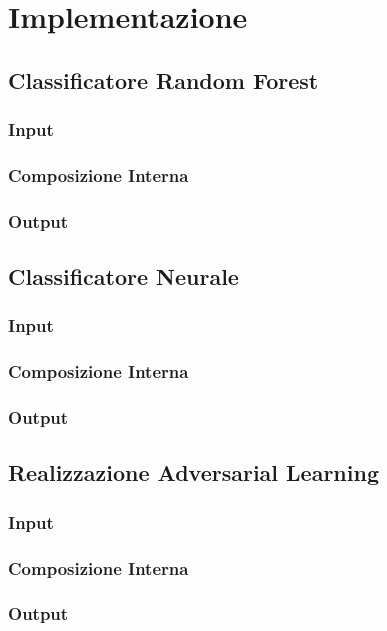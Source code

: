 \chapter{Implementazione}
\label{implementazione}



\section{Classificatore Random Forest}
\label{imprandomforest}

\subsection{Input}
\label{imprandomforestinput}

\subsection{Composizione Interna}
\label{imprandomforestinterno}

\subsection{Output}
\label{imprandomforestoutput}

\section{Classificatore Neurale}
\label{impclassificatorenn}

\subsection{Input}
\label{impclassificatorenninput}

\subsection{Composizione Interna}
\label{impclassificatorenninterno}

\subsection{Output}
\label{impclassificatorennoutput}

\section{Realizzazione Adversarial Learning}
\label{impadv}

\subsection{Input}
\label{impadvinput}

\subsection{Composizione Interna}
\label{impadvinterno}

\subsection{Output}
\label{advoutput}